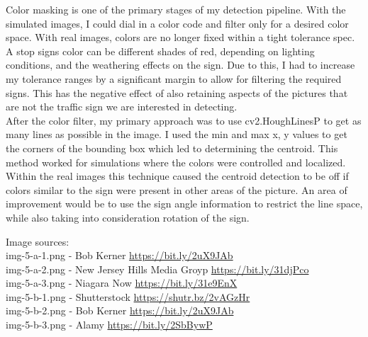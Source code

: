 Color masking is one of the primary stages of my detection pipeline. With the simulated images, I could dial in a color code and filter only for a desired color space. With real images, colors are no longer fixed within a tight tolerance spec. A stop signs color can be different shades of red, depending on lighting conditions, and the weathering effects on the sign. Due to this, I had to increase my tolerance ranges by a significant margin to allow for filtering the required signs. This has the negative effect of also retaining aspects of the pictures that are not the traffic sign we are interested in detecting.\\

After the color filter, my primary approach was to use cv2.HoughLinesP to get as many lines as possible in the image. I used the min and max x, y values to get the corners of the bounding box which led to determining the centroid. This method worked for simulations where the colors were controlled and localized. Within the real images this technique caused the centroid detection to be off if colors similar to the sign were present in other areas of the picture.\hfill
An area of improvement would be to use the sign angle information to restrict the line space, while also taking into consideration rotation of the sign.

\vspace{3mm} %

Image sources:\\
img-5-a-1.png - Bob Kerner \url{https://bit.ly/2uX9JAb} \\
img-5-a-2.png - New Jersey Hills Media Groyp \url{https://bit.ly/31djPco}\\
img-5-a-3.png - Niagara Now \url{https://bit.ly/31e9EnX}\\

img-5-b-1.png - Shutterstock \url{https://shutr.bz/2vAGzHr}\\
img-5-b-2.png - Bob Kerner \url{https://bit.ly/2uX9JAb} \\
img-5-b-3.png - Alamy \url{https://bit.ly/2SbBywP}\\
